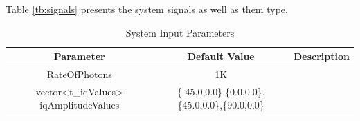 Table \ref{tb:signals} presents the system signals as well as them type.

\begin{table}[H]
\centering
\caption{System Input Parameters}
\label{tb:inputparameters}
\begin{tabular}{|c|c|c|}
\hline
\textbf{Parameter}                      & \textbf{Default Value}                                & \textbf{Description} \\ \hline
RateOfPhotons                           & 1K                                                    &                 \\ \hline
vector<t\_iqValues> iqAmplitudeValues   & \{-45.0,0.0\},\{0.0,0.0\},\{45.0,0.0\},\{90.0,0.0\}   &                 \\ \hline

\end{tabular}
\end{table}

